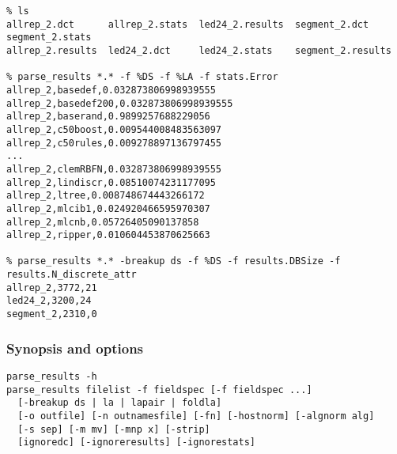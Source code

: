 \documentclass[a4paper,10pt,twoside]{article}
\begin{document}
{\footnotesize
\begin{verbatim}
% ls
allrep_2.dct      allrep_2.stats  led24_2.results  segment_2.dct      segment_2.stats
allrep_2.results  led24_2.dct     led24_2.stats    segment_2.results

% parse_results *.* -f %DS -f %LA -f stats.Error 
allrep_2,basedef,0.032873806998939555
allrep_2,basedef200,0.032873806998939555
allrep_2,baserand,0.9899257688229056
allrep_2,c50boost,0.009544008483563097
allrep_2,c50rules,0.009278897136797455
...
allrep_2,clemRBFN,0.032873806998939555
allrep_2,lindiscr,0.08510074231177095
allrep_2,ltree,0.008748674443266172
allrep_2,mlcib1,0.024920466595970307
allrep_2,mlcnb,0.05726405090137858
allrep_2,ripper,0.010604453870625663

% parse_results *.* -breakup ds -f %DS -f results.DBSize -f results.N_discrete_attr
allrep_2,3772,21
led24_2,3200,24
segment_2,2310,0
\end{verbatim}
}

\subsubsection{Synopsis and options}

\begin{verbatim}
parse_results -h
parse_results filelist -f fieldspec [-f fieldspec ...] 
  [-breakup ds | la | lapair | foldla]
  [-o outfile] [-n outnamesfile] [-fn] [-hostnorm] [-algnorm alg]
  [-s sep] [-m mv] [-mnp x] [-strip]
  [ignoredc] [-ignoreresults] [-ignorestats] 
\end{verbatim}
\end{document}
